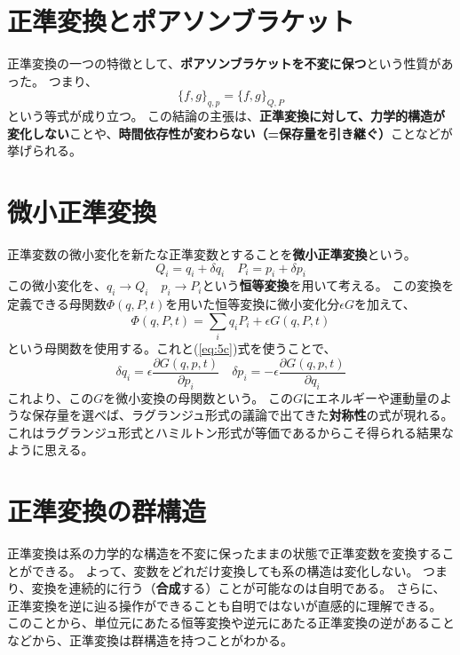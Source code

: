\documentclass[a4paper]{jsreport}
\begin{document}
        \section{正準変換とポアソンブラケット}
            正準変換の一つの特徴として、\textbf{ポアソンブラケットを不変に保つ}という性質があった。
            つまり、
            \begin{equation}
                \{ f, g \}_{q, p} = \{ f, g \}_{Q, P}
            \end{equation}
            という等式が成り立つ。
            この結論の主張は、\textbf{正準変換に対して、力学的構造が変化しない}ことや、\textbf{時間依存性が変わらない（=保存量を引き継ぐ）}ことなどが挙げられる。

        \section{微小正準変換}
            正準変数の微小変化を新たな正準変数とすることを\textbf{微小正準変換}という。
            \begin{equation}
                Q_i = q_i + \delta q_i \quad P_i = p_i + \delta p_i
            \end{equation} 
            この微小変化を、$q_i \to Q_i \quad p_i \to P_i$という\textbf{恒等変換}を用いて考える。
            この変換を定義できる母関数$\Phi (q, P, t)$を用いた恒等変換に微小変化分$\epsilon G$を加えて、
            \begin{equation}
                \Phi (q, P, t) = \sum_{i} q_iP_i + \epsilon G(q, P, t)
            \end{equation}
            という母関数を使用する。これと(\ref{eq:5c})式を使うことで、
            \begin{equation}
                \delta q_i = \epsilon \frac{\partial G(q, p, t)}{\partial p_i} \quad \delta p_i = - \epsilon \frac{\partial G(q, p, t)}{\partial q_i}
            \end{equation}
            これより、この$G$を微小変換の母関数という。
            この$G$にエネルギーや運動量のような保存量を選べば、ラグランジュ形式の議論で出てきた\textbf{対称性}の式が現れる。
            これはラグランジュ形式とハミルトン形式が等価であるからこそ得られる結果なように思える。

        \section{正準変換の群構造}
            正準変換は系の力学的な構造を不変に保ったままの状態で正準変数を変換することができる。
            よって、変数をどれだけ変換しても系の構造は変化しない。
            つまり、変換を連続的に行う（\textbf{合成}する）ことが可能なのは自明である。
            さらに、正準変換を逆に辿る操作ができることも自明ではないが直感的に理解できる。
            このことから、単位元にあたる恒等変換や逆元にあたる正準変換の逆があることなどから、正準変換は群構造を持つことがわかる。
\end{document}
